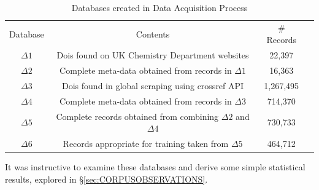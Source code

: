\begin{table}[H]
\caption{Databases created in Data Acquisition Process}
\label{tab:DATABASES}
\begin{tabular}{||c|c|c|c||}
\hline 
Database &  Contents & \# Records\\
$\Delta1$ & Dois found on UK Chemistry Department websites & 22,397 \\
$\Delta2$ & Complete meta-data obtained from records in $\Delta1$ & 16,363 \\
$\Delta3$ & Dois found in global scraping using crossref API & 1,267,495  \\
$\Delta4$ & Complete meta-data obtained from records in $\Delta3$ & 714,370 \\
$\Delta5$ & Complete records obtained from combining $\Delta2$ and $\Delta4$ & 730,733 \\
$\Delta6$ & Records appropriate for training taken from $\Delta5$ & 464,712 \\
\end{tabular}
\end{table}


It was instructive to examine these databases and derive some simple statistical results, explored in \S\ref{sec:CORPUSOBSERVATIONS}.